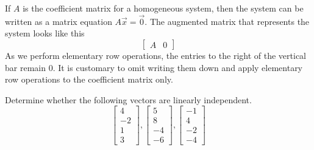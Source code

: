 \documentclass{ximera}
\begin{document}
If $A$ is the coefficient matrix for a homogeneous system, then the system can be written as a matrix equation $A\vec{x}=\vec{0}$. The augmented matrix that represents the system looks like this
$$\left[\begin{array}{c|c}  
 A&0
 \end{array}\right]$$
As we perform elementary row operations, the entries to the right of the vertical bar remain $0$.  It is customary to omit writing them down and apply elementary row operations to the coefficient matrix only.
\begin{example}
Determine whether the following vectors are linearly independent.
$$\begin{bmatrix}4\\-2\\1\\3\end{bmatrix}, \begin{bmatrix}5\\8\\-4\\-6\end{bmatrix}, \begin{bmatrix}-1\\4\\-2\\-4\end{bmatrix}$$


\end{example}
\end{document}
